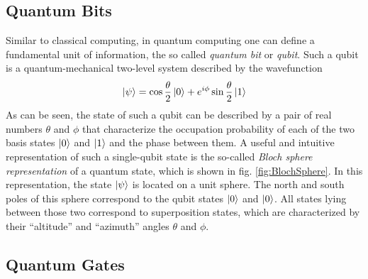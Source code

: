 \subsection{Quantum Bits}

Similar to classical computing, in quantum computing one can define a fundamental unit of information, the so called {\it quantum bit} or {\it qubit}. Such a qubit is a quantum-mechanical two-level system described by the wavefunction
%
\begin{equation}
\left| \psi \right> = \cos{\frac{\theta}{2}}\left| 0 \right>+e^{i\phi}\sin{\frac{\theta}{2}}\left| 1 \right>
\end{equation}
%
As can be seen, the state of such a qubit can be described by a pair of real numbers $\theta$ and $\phi$ that characterize the occupation probability of each of the two basis states $\left| 0 \right>$ and $\left| 1 \right>$ and the phase between them. A useful and intuitive representation of such a single-qubit state is the so-called {\it Bloch sphere representation} of a quantum state, which is shown in fig. \ref{fig:BlochSphere}. In this representation, the state $\left| \psi \right>$ is located on a unit sphere. The north and south poles of this sphere correspond to the qubit states $\left| 0 \right>$ and $\left| 0 \right>$. All states lying between those two correspond to superposition states, which are characterized by their ``altitude'' and ``azimuth'' angles $\theta$ and $\phi$.

\subsection{Quantum Gates}

